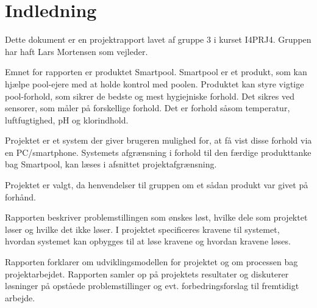 \chapter{Indledning}






Dette dokument er en projektrapport lavet af gruppe 3 i kurset I4PRJ4. Gruppen har haft Lars Mortensen som vejleder. 

Emnet for rapporten er produktet Smartpool. Smartpool er et produkt, som kan hjælpe pool-ejere med at holde kontrol med poolen. Produktet kan styre vigtige pool-forhold, som sikrer de bedste og mest hygiejniske forhold. Det sikres ved sensorer, som måler på forskellige forhold. Det er forhold såsom temperatur, luftfugtighed, pH og klorindhold. 

Projektet er et system der giver brugeren mulighed for, at få vist disse forhold via en PC/smartphone. Systemets afgrænsning i forhold til den færdige produkttanke bag Smartpool, kan læses i afsnittet projektafgrænsning.

Projektet er valgt, da henvendelser til gruppen om et sådan produkt var givet på forhånd. 

Rapporten beskriver problemstillingen som ønskes løst, hvilke dele som projektet løser og hvilke det ikke løser. I projektet specificeres kravene til systemet, hvordan systemet kan opbygges til at løse kravene og hvordan kravene løses. 

Rapporten forklarer om udviklingsmodellen for projektet og om processen bag projektarbejdet. Rapporten samler op på projektets resultater og diskuterer løsninger på opståede problemstillinger og evt. forbedringsforslag til fremtidigt arbejde. 

